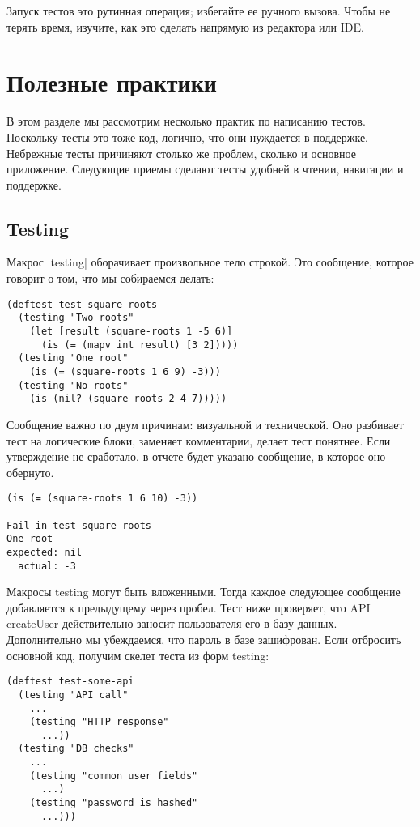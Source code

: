 Запуск тестов это рутинная операция; избегайте ее ручного вызова. Чтобы не
терять время, изучите, как это сделать напрямую из редактора или IDE.

\section{Полезные практики}

В этом разделе мы рассмотрим несколько практик по написанию тестов. Поскольку
тесты это тоже код, логично, что они нуждается в поддержке. Небрежные тесты
причиняют столько же проблем, сколько и основное приложение. Следующие приемы
сделают тесты удобней в чтении, навигации и поддержке.

\subsection{Testing}

Макрос \spverb|testing| оборачивает произвольное тело строкой. Это сообщение, которое
говорит о том, что мы собираемся делать:

\begin{verbatim}
(deftest test-square-roots
  (testing "Two roots"
    (let [result (square-roots 1 -5 6)]
      (is (= (mapv int result) [3 2]))))
  (testing "One root"
    (is (= (square-roots 1 6 9) -3)))
  (testing "No roots"
    (is (nil? (square-roots 2 4 7)))))
\end{verbatim}

Сообщение важно по двум причинам: визуальной и технической. Оно разбивает тест
на логические блоки, заменяет комментарии, делает тест понятнее. Если
утверждение не сработало, в отчете будет указано сообщение, в которое оно
обернуто.

\begin{verbatim}
(is (= (square-roots 1 6 10) -3))

Fail in test-square-roots
One root
expected: nil
  actual: -3
\end{verbatim}

Макросы testing могут быть вложенными. Тогда каждое следующее сообщение
добавляется к предыдущему через пробел. Тест ниже проверяет, что API createUser
действительно заносит пользователя его в базу данных. Дополнительно мы
убеждаемся, что пароль в базе зашифрован. Если отбросить основной код, получим
скелет теста из форм testing:

\begin{verbatim}
(deftest test-some-api
  (testing "API call"
    ...
    (testing "HTTP response"
      ...))
  (testing "DB checks"
    ...
    (testing "common user fields"
      ...)
    (testing "password is hashed"
      ...)))
\end{verbatim}

